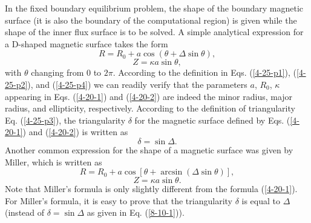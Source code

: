 \documentclass{article}
\begin{document}
In the fixed boundary equilibrium problem, the shape of the boundary magnetic
surface (it is also the boundary of the computational region) is given while
the shape of the inner flux surface is to be solved. A simple analytical
expression for a D-shaped magnetic surface takes the form
\begin{equation}
  \label{4-20-1} R = R_0 + a \cos (\theta + \Delta \sin \theta),
\end{equation}
\begin{equation}
  \label{4-20-2} Z = \kappa a \sin \theta,
\end{equation}
with $\theta$ changing from $0$ to $2 \pi$. According to the definition in
Eqs. (\ref{4-25-p1}), (\ref{4-25-p2}), and (\ref{4-25-p4}) we can readily
verify that the parameters $a$, $R_0$, $\kappa$ appearing in Eqs.
(\ref{4-20-1}) and (\ref{4-20-2}) are indeed the minor radius, major radius,
and ellipticity, respectively. According to the definition of triangularity
Eq. (\ref{4-25-p3}), the triangularity $\delta$ for the magnetic surface
defined by Eqs. (\ref{4-20-1}) and (\ref{4-20-2}) is written as
\begin{equation}
  \label{8-10-1} \delta = \sin \Delta .
\end{equation}
Another common expression for the shape of a magnetic surface was given by
Miller{\cite{chen2010,miller1998}}, which is written as
\begin{equation}
  \label{10-31-e1} R = R_0 + a \cos [\theta + \arcsin (\Delta \sin \theta)],
\end{equation}
\begin{equation}
  \label{10-31-e2} Z = \kappa a \sin \theta .
\end{equation}
Note that Miller's formula is only slightly different from the formula
(\ref{4-20-1}). For Miller's formula, it is easy to prove that the
triangularity $\delta$ is equal to $\Delta$ (instead of $\delta = \sin \Delta$
as given in Eq. (\ref{8-10-1})).
\end{document}
